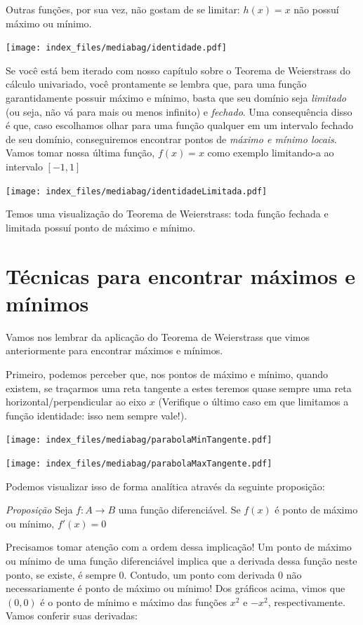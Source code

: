 \documentclass[
  letterpaper,
  DIV=11,
  numbers=noendperiod]{scrreprt}
\begin{document}
Outras funções, por sua vez, não gostam de se limitar: \(h(x) = x\) não
possuí máximo ou mínimo.

\texttt{[image: index\_files/mediabag/identidade.pdf]}

Se você está bem iterado com nosso capítulo sobre o Teorema de
Weierstrass do cálculo univariado, você prontamente se lembra que, para
uma função garantidamente possuir máximo e mínimo, basta que seu domínio
seja \emph{limitado} (ou seja, não vá para mais ou menos infinito) e
\emph{fechado}. Uma consequência disso é que, caso escolhamos olhar para
uma função qualquer em um intervalo fechado de seu domínio,
conseguiremos encontrar pontos de \emph{máximo e mínimo locais}. Vamos
tomar nossa última função, \(f(x) = x\) como exemplo limitando-a ao
intervalo \([-1,1]\)

\texttt{[image: index\_files/mediabag/identidadeLimitada.pdf]}

Temos uma visualização do Teorema de Weierstrass: toda função fechada e
limitada possuí ponto de máximo e mínimo.

\section{Técnicas para encontrar máximos e
mínimos}\label{tuxe9cnicas-para-encontrar-muxe1ximos-e-muxednimos}

Vamos nos lembrar da aplicação do Teorema de Weierstrass que vimos
anteriormente para encontrar máximos e mínimos.

Primeiro, podemos perceber que, nos pontos de máximo e mínimo, quando
existem, se traçarmos uma reta tangente a estes teremos quase sempre uma
reta horizontal/perpendicular ao eixo \(x\) (Verifique o último caso em
que limitamos a função identidade: isso nem sempre vale!).

\texttt{[image: index\_files/mediabag/parabolaMinTangente.pdf]}

\texttt{[image: index\_files/mediabag/parabolaMaxTangente.pdf]}

Podemos visualizar isso de forma analítica através da seguinte
proposição:

\emph{Proposição} Seja \(f: A\rightarrow B\) uma função diferenciável.
Se \(f(x)\) é ponto de máximo ou mínimo, \(f'(x) = 0\)

Precisamos tomar atenção com a ordem dessa implicação! Um ponto de
máximo ou mínimo de uma função diferenciável implica que a derivada
dessa função neste ponto, se existe, é sempre 0. Contudo, um ponto com
derivada 0 não necessariamente é ponto de máximo ou mínimo! Dos gráficos
acima, vimos que \((0,0)\) é o ponto de mínimo e máximo das funções
\(x^2\) e \(-x^2\), respectivamente. Vamos conferir suas derivadas:
\end{document}
